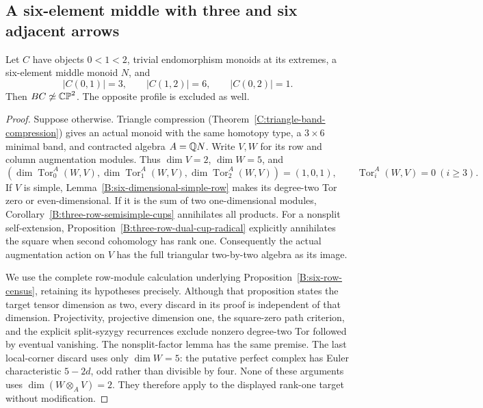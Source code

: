 \subsection{A six-element middle with three and six adjacent arrows}

\begin{proposition}\label{C:middle-six-three-six}
Let $C$ have objects $0<1<2$, trivial endomorphism monoids at its
extremes, a six-element middle monoid $N$, and
\[
 |C(0,1)|=3,\qquad |C(1,2)|=6,\qquad |C(0,2)|=1.
\]
Then $BC\not\simeq\mathbb {CP}^2$.  The opposite profile is excluded as well.
\end{proposition}

\begin{proof}
Suppose otherwise.  Triangle compression
(Theorem~\ref{C:triangle-band-compression}) gives an actual monoid
with the same homotopy type, a $3\times6$ minimal band, and contracted
algebra $A=\mathbb Q N$.  Write $V,W$ for its row and column augmentation
modules.  Thus $\dim V=2$, $\dim W=5$, and
\[
 (\dim\operatorname{Tor}_0^A(W,V),
   \dim\operatorname{Tor}_1^A(W,V),
   \dim\operatorname{Tor}_2^A(W,V))=(1,0,1),
 \qquad \operatorname{Tor}_i^A(W,V)=0\ (i\geq3).
\]
If $V$ is simple, Lemma~\ref{B:six-dimensional-simple-row} makes its
degree-two Tor zero or even-dimensional.  If it is the sum of two
one-dimensional modules, Corollary~\ref{B:three-row-semisimple-cups}
annihilates all products.  For a nonsplit self-extension,
Proposition~\ref{B:three-row-dual-cup-radical} explicitly annihilates
the square when second cohomology has rank one.
Consequently the actual augmentation action on $V$ has the full
triangular two-by-two algebra as its image.

We use the complete row-module calculation underlying
Proposition~\ref{B:six-row-census}, retaining its hypotheses precisely.
Although that proposition states the target tensor dimension as two,
every discard in its proof is independent of that dimension.
Projectivity, projective dimension one, the square-zero path criterion,
and the explicit split-syzygy recurrences exclude nonzero degree-two
Tor followed by eventual vanishing.  The nonsplit-factor lemma has the
same premise.  The last local-corner discard uses only $\dim W=5$:
the putative perfect complex has Euler characteristic $5-2d$, odd
rather than divisible by four.  None of these arguments uses
$\dim(W\otimes_A V)=2$.  They therefore apply to the displayed
rank-one target without modification.


\end{proof}
